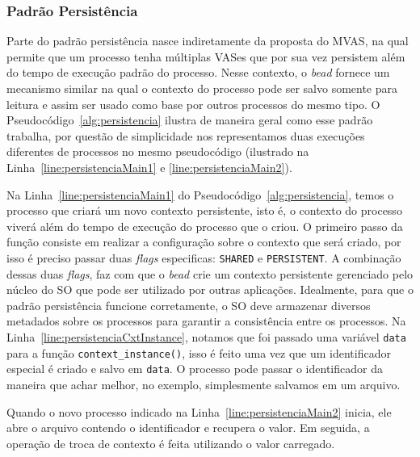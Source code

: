 \subsubsection{Padrão Persistência}

Parte do padrão persistência nasce indiretamente da proposta do MVAS, na qual
permite que um processo tenha múltiplas VASes que por sua vez persistem além do
tempo de execução padrão do processo. Nesse contexto, o \emph{bead} fornece um
mecanismo similar na qual o contexto do processo pode ser salvo somente
para leitura e assim ser usado como base por outros processos do mesmo tipo. O
Pseudocódigo~\ref{alg:persistencia} ilustra de maneira geral como esse
padrão trabalha, por questão de simplicidade nos representamos duas execuções
diferentes de processos no mesmo pseudocódigo (ilustrado na
Linha~\ref{line:persistenciaMain1} e \ref{line:persistenciaMain2}).



Na Linha~\ref{line:persistenciaMain1} do Pseudocódigo~\ref{alg:persistencia},
temos o processo que criará um novo contexto persistente, isto é, o contexto do
processo viverá além do tempo de execução do processo que o criou. O primeiro
passo da função consiste em realizar a configuração sobre o contexto que será
criado, por isso é preciso passar duas \emph{flags} especificas:
\texttt{SHARED} e \texttt{PERSISTENT}. A combinação dessas duas \emph{flags},
faz com que o \emph{bead} crie um contexto persistente gerenciado pelo núcleo
do SO que pode ser utilizado por outras aplicações. Idealmente, para que o
padrão persistência funcione corretamente, o SO deve armazenar diversos
metadados sobre os processos para garantir a consistência entre os processos.
Na Linha~\ref{line:persistenciaCxtInstance}, notamos que foi passado uma
variável \texttt{data} para a função \texttt{context\_instance()}, isso é feito
uma vez que um identificador especial é criado e salvo em \texttt{data}. O
processo pode passar o identificador da maneira que achar melhor, no exemplo,
simplesmente salvamos em um arquivo.

Quando o novo processo indicado na Linha~\ref{line:persistenciaMain2} inicia,
ele abre o arquivo contendo o identificador e recupera o valor. Em seguida, a
operação de troca de contexto é feita utilizando o valor carregado.

